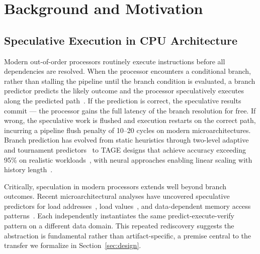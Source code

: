 \documentclass[conference,10pt]{IEEEtran}
\begin{document}

\section{Background and Motivation}
\label{sec:background}


\subsection{Speculative Execution in CPU Architecture}

Modern out-of-order processors routinely execute instructions before all dependencies are resolved.
When the processor encounters a conditional branch, rather than stalling the pipeline until the branch condition is evaluated, a branch predictor predicts the likely outcome and the processor speculatively executes along the predicted path~\cite{hennessy2017computer}.
If the prediction is correct, the speculative results commit --- the processor gains the full latency of the branch resolution for free.
If wrong, the speculative work is flushed and execution restarts on the correct path, incurring a pipeline flush penalty of 10--20 cycles on modern microarchitectures.
Branch prediction has evolved from static heuristics through two-level adaptive~\cite{yeh1991two} and tournament predictors~\cite{mcfarling1993combining} to TAGE designs that achieve accuracy exceeding 95\% on realistic workloads~\cite{seznec2006tage, seznec2011tage}, with neural approaches enabling linear scaling with history length~\cite{jimenez2001perceptron}.

Critically, speculation in modern processors extends well beyond branch outcomes.
Recent microarchitectural analyses have uncovered speculative predictors for load addresses~\cite{kim2025slap}, load values~\cite{kim2025flop}, and data-dependent memory access patterns~\cite{chen2024gofetch}. Each independently instantiates the same predict-execute-verify pattern on a different data domain.
This repeated rediscovery suggests the abstraction is fundamental rather than artifact-specific, a premise central to the transfer we formalize in Section~\ref{sec:design}.
\end{document}
